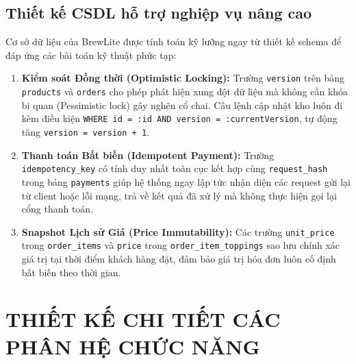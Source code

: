 \documentclass[12pt,a4paper,oneside]{report}
\begin{document}
\section{Thiết kế CSDL hỗ trợ nghiệp vụ nâng cao}
Cơ sở dữ liệu của BrewLite được tính toán kỹ lưỡng ngay từ thiết kế schema để đáp ứng các bài toán kỹ thuật phức tạp:
\begin{enumerate}
    \item \textbf{Kiểm soát Đồng thời (Optimistic Locking):} Trường \texttt{version} trên bảng \texttt{products} và \texttt{orders} cho phép phát hiện xung đột dữ liệu mà không cần khóa bi quan (Pessimistic lock) gây nghẽn cổ chai. Câu lệnh cập nhật kho luôn đi kèm điều kiện \texttt{WHERE id = :id AND version = :currentVersion}, tự động tăng \texttt{version = version + 1}.
    \item \textbf{Thanh toán Bất biến (Idempotent Payment):} Trường \texttt{idempotency\_key} có tính duy nhất toàn cục kết hợp cùng \texttt{request\_hash} trong bảng \texttt{payments} giúp hệ thống ngay lập tức nhận diện các request gửi lại từ client hoặc lỗi mạng, trả về kết quả đã xử lý mà không thực hiện gọi lại cổng thanh toán.
    \item \textbf{Snapshot Lịch sử Giá (Price Immutability):} Các trường \texttt{unit\_price} trong \texttt{order\_items} và \texttt{price} trong \texttt{order\_item\_toppings} sao lưu chính xác giá trị tại thời điểm khách hàng đặt, đảm bảo giá trị hóa đơn luôn cố định bất biến theo thời gian.
\end{enumerate}



\chapter{THIẾT KẾ CHI TIẾT CÁC PHÂN HỆ CHỨC NĂNG}
\end{document}
